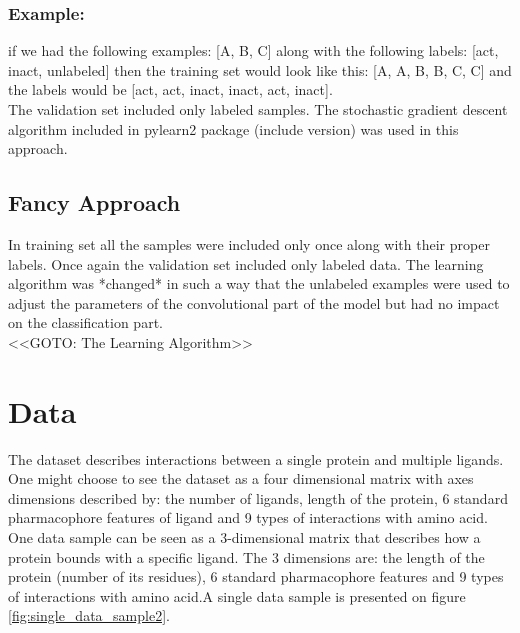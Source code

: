 \documentclass[a4paper,10pt]{report}
\begin{document}
	  \subsubsection{Example:} if we had the following examples: [A, B, C] along with the following labels: [act, inact, unlabeled] then the training set would look like this: [A, A, B, B, C, C] and the labels would be [act, act, inact, inact, act, inact].\\
	  
	  The validation set included only labeled samples. The stochastic gradient descent algorithm included in pylearn2 package (include version) was used in this approach.\\
	  
	\subsection{Fancy Approach}
	In training set all the samples were included only once along with their proper labels. Once again the validation set included only labeled data. The learning algorithm was *changed* in such a way that the unlabeled examples were used to adjust the parameters of the convolutional part of the model but had no impact on the classification part.\\
    
	<<GOTO: The Learning Algorithm>>\\      
      
      \section{Data}
	The dataset describes interactions between a single protein and multiple ligands. One might choose to see the dataset as a four dimensional matrix with axes dimensions described by: the number of ligands, length of the protein, 6 standard pharmacophore features of ligand and 9 types of interactions with amino acid\cite{2DSIFT}. One data sample can be seen as a 3-dimensional matrix that describes how a protein bounds with a specific ligand. The 3 dimensions are: the length of the protein (number of its residues), 6 standard pharmacophore features and 9 types of interactions with amino acid.A single data sample is presented on figure \ref{fig:single_data_sample2}.\\
	
\end{document}

